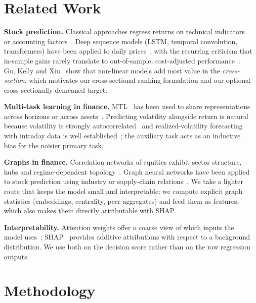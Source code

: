 \documentclass[conference]{IEEEtran}
\begin{document}
\section{Related Work}
\textbf{Stock prediction.} Classical approaches regress returns on technical indicators or accounting factors~\cite{fama1993,jegadeesh1993}. Deep sequence models (LSTM, temporal convolution, transformers) have been applied to daily prices~\cite{fischer2018,sezer2020}, with the recurring criticism that in-sample gains rarely translate to out-of-sample, cost-adjusted performance~\cite{gu2020}. Gu, Kelly and Xiu~\cite{gu2020} show that non-linear models add most value in the \emph{cross-section}, which motivates our cross-sectional ranking formulation and our optional cross-sectionally demeaned target.

\textbf{Multi-task learning in finance.} MTL~\cite{caruana1997,ruder2017} has been used to share representations across horizons or across assets~\cite{ma2021mtl}. Predicting volatility alongside return is natural because volatility is strongly autocorrelated~\cite{engle1982,bollerslev1986} and realized-volatility forecasting with intraday data is well established~\cite{andersen2003}; the auxiliary task acts as an inductive bias for the noisier primary task.

\textbf{Graphs in finance.} Correlation networks of equities exhibit sector structure, hubs and regime-dependent topology~\cite{mantegna1999,onnela2003}. Graph neural networks have been applied to stock prediction using industry or supply-chain relations~\cite{feng2019,chen2018}. We take a lighter route that keeps the model small and interpretable: we compute explicit graph statistics (embeddings, centrality, peer aggregates) and feed them as features, which also makes them directly attributable with SHAP.

\textbf{Interpretability.} Attention weights offer a coarse view of which inputs the model uses~\cite{vaswani2017}; SHAP~\cite{lundberg2017} provides additive attributions with respect to a background distribution. We use both on the decision score rather than on the raw regression outputs.

\section{Methodology}
\end{document}
